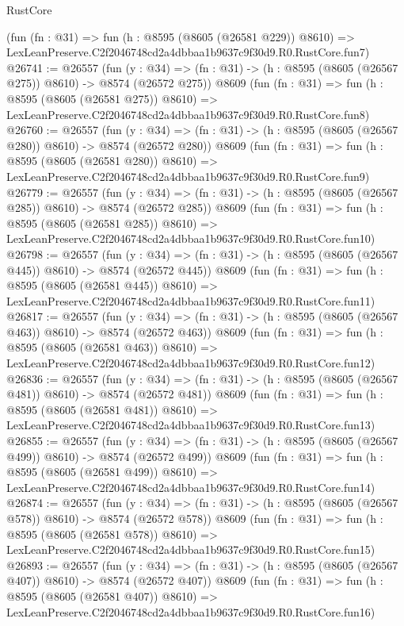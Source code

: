 \begin{lexlean}{RustCore}
\begin{coremodule}
    (fun (fn : @31) =>
    fun (h : @8595 (@8605 (@26581 @229)) @8610) =>
    LexLeanPreserve.C2f2046748cd2a4dbbaa1b9637c9f30d9.R0.RustCore.fun7)
@26741 := @26557
    (fun (y : @34) => (fn : @31) -> (h : @8595 (@8605 (@26567 @275)) @8610) -> @8574 (@26572 @275))
    @8609
    (fun (fn : @31) =>
    fun (h : @8595 (@8605 (@26581 @275)) @8610) =>
    LexLeanPreserve.C2f2046748cd2a4dbbaa1b9637c9f30d9.R0.RustCore.fun8)
@26760 := @26557
    (fun (y : @34) => (fn : @31) -> (h : @8595 (@8605 (@26567 @280)) @8610) -> @8574 (@26572 @280))
    @8609
    (fun (fn : @31) =>
    fun (h : @8595 (@8605 (@26581 @280)) @8610) =>
    LexLeanPreserve.C2f2046748cd2a4dbbaa1b9637c9f30d9.R0.RustCore.fun9)
@26779 := @26557
    (fun (y : @34) => (fn : @31) -> (h : @8595 (@8605 (@26567 @285)) @8610) -> @8574 (@26572 @285))
    @8609
    (fun (fn : @31) =>
    fun (h : @8595 (@8605 (@26581 @285)) @8610) =>
    LexLeanPreserve.C2f2046748cd2a4dbbaa1b9637c9f30d9.R0.RustCore.fun10)
@26798 := @26557
    (fun (y : @34) => (fn : @31) -> (h : @8595 (@8605 (@26567 @445)) @8610) -> @8574 (@26572 @445))
    @8609
    (fun (fn : @31) =>
    fun (h : @8595 (@8605 (@26581 @445)) @8610) =>
    LexLeanPreserve.C2f2046748cd2a4dbbaa1b9637c9f30d9.R0.RustCore.fun11)
@26817 := @26557
    (fun (y : @34) => (fn : @31) -> (h : @8595 (@8605 (@26567 @463)) @8610) -> @8574 (@26572 @463))
    @8609
    (fun (fn : @31) =>
    fun (h : @8595 (@8605 (@26581 @463)) @8610) =>
    LexLeanPreserve.C2f2046748cd2a4dbbaa1b9637c9f30d9.R0.RustCore.fun12)
@26836 := @26557
    (fun (y : @34) => (fn : @31) -> (h : @8595 (@8605 (@26567 @481)) @8610) -> @8574 (@26572 @481))
    @8609
    (fun (fn : @31) =>
    fun (h : @8595 (@8605 (@26581 @481)) @8610) =>
    LexLeanPreserve.C2f2046748cd2a4dbbaa1b9637c9f30d9.R0.RustCore.fun13)
@26855 := @26557
    (fun (y : @34) => (fn : @31) -> (h : @8595 (@8605 (@26567 @499)) @8610) -> @8574 (@26572 @499))
    @8609
    (fun (fn : @31) =>
    fun (h : @8595 (@8605 (@26581 @499)) @8610) =>
    LexLeanPreserve.C2f2046748cd2a4dbbaa1b9637c9f30d9.R0.RustCore.fun14)
@26874 := @26557
    (fun (y : @34) => (fn : @31) -> (h : @8595 (@8605 (@26567 @578)) @8610) -> @8574 (@26572 @578))
    @8609
    (fun (fn : @31) =>
    fun (h : @8595 (@8605 (@26581 @578)) @8610) =>
    LexLeanPreserve.C2f2046748cd2a4dbbaa1b9637c9f30d9.R0.RustCore.fun15)
@26893 := @26557
    (fun (y : @34) => (fn : @31) -> (h : @8595 (@8605 (@26567 @407)) @8610) -> @8574 (@26572 @407))
    @8609
    (fun (fn : @31) =>
    fun (h : @8595 (@8605 (@26581 @407)) @8610) =>
    LexLeanPreserve.C2f2046748cd2a4dbbaa1b9637c9f30d9.R0.RustCore.fun16)

\end{coremodule}
\end{lexlean}
